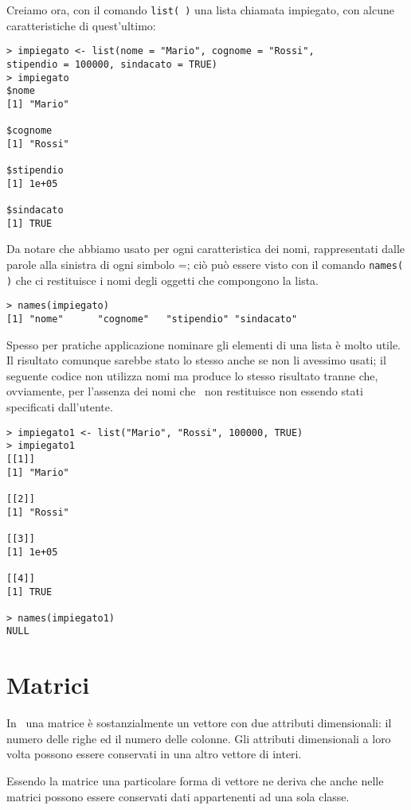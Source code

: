 Creiamo ora, con il comando \lstinline!list( )! una lista chiamata impiegato, con alcune caratteristiche di quest'ultimo:

\begin{lstlisting}
> impiegato <- list(nome = "Mario", cognome = "Rossi", 
stipendio = 100000, sindacato = TRUE)
> impiegato
$nome
[1] "Mario"

$cognome
[1] "Rossi"

$stipendio
[1] 1e+05

$sindacato
[1] TRUE
\end{lstlisting}

Da notare che abbiamo usato per ogni caratteristica dei nomi, rappresentati dalle parole alla sinistra di ogni simbolo =; ciò può essere visto con il comando \lstinline!names( )! che ci restituisce i nomi degli oggetti che compongono la lista.
\begin{lstlisting}
> names(impiegato)
[1] "nome"      "cognome"   "stipendio" "sindacato"
\end{lstlisting}

Spesso per pratiche applicazione nominare gli elementi di una lista è molto utile. Il risultato comunque sarebbe stato lo stesso anche se non li avessimo usati; il seguente codice non utilizza nomi ma produce lo stesso risultato tranne che, ovviamente, per l'assenza dei nomi che \erre\ non restituisce non essendo stati specificati dall'utente.
\begin{lstlisting}
> impiegato1 <- list("Mario", "Rossi", 100000, TRUE)
> impiegato1
[[1]]
[1] "Mario"

[[2]]
[1] "Rossi"

[[3]]
[1] 1e+05

[[4]]
[1] TRUE

> names(impiegato1)
NULL
\end{lstlisting}

\section{Matrici}

In \erre\ una matrice è sostanzialmente un vettore con due attributi dimensionali: il numero delle righe ed il numero delle colonne. Gli attributi dimensionali a loro volta possono essere conservati in una altro vettore di interi.

Essendo la matrice una particolare forma di vettore ne deriva che anche nelle matrici possono essere conservati dati appartenenti ad una sola classe.

